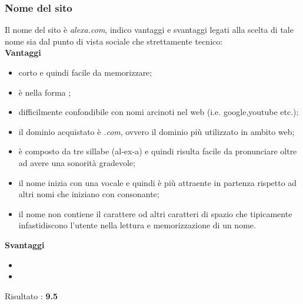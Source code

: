 \subsubsection{Nome del sito}
Il nome del sito è \textit{alexa.com}, indico vantaggi e svantaggi legati alla scelta di tale nome sia dal punto di vista sociale che strettamente tecnico: \\
\textbf{Vantaggi}
\begin{itemize}
	\item corto e quindi facile da memorizzare;
	\item è nella forma ;
	\item difficilmente confondibile con nomi arcinoti nel web (i.e. google,youtube etc.);
	\item il dominio acquistato è \textit{.com}, ovvero il dominio più utilizzato in ambito web;
	\item è composto da tre sillabe (al-ex-a) e quindi risulta facile da pronunciare
	oltre ad avere una sonorità gradevole;
	\item il nome inizia con una vocale e quindi è più attraente in partenza rispetto
	ad altri nomi che iniziano con consonante;
	\item il nome non contiene il carattere \quotes{-} od altri caratteri di spazio 
	che tipicamente infastidiscono l'utente nella lettura e memorizzazione di un nome.
\end{itemize}
\textbf{Svantaggi}
\begin{itemize}
	\item 
	\item 
\end{itemize}
Risultato : \textbf{9.5}
